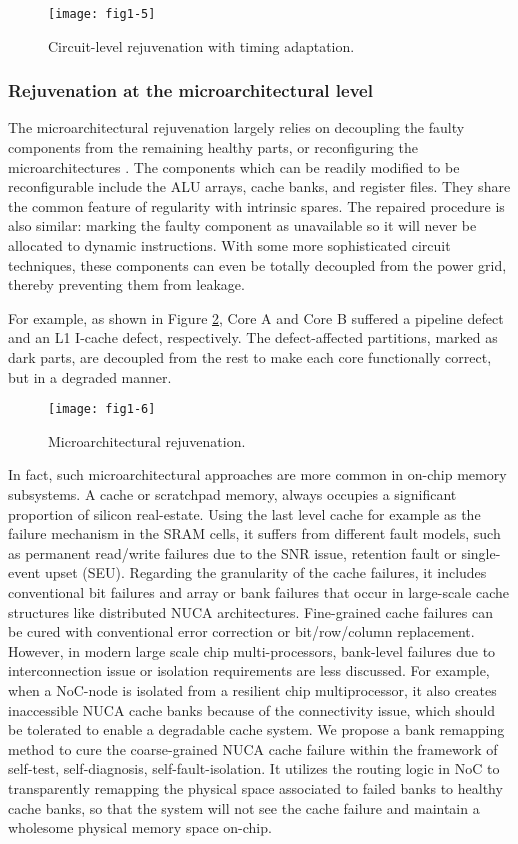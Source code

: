 \begin{figure}[t]
\centering
\texttt{[image: fig1-5]}
\caption{Circuit-level rejuvenation with timing adaptation.}
\label{fig:circuit-repair} 
\end{figure}


\subsubsection{Rejuvenation at the microarchitectural level}
The microarchitectural rejuvenation largely relies on decoupling the faulty components from the remaining healthy parts, or reconfiguring the microarchitectures \cite{salvaging}. The components which can be readily modified to be reconfigurable include the ALU arrays, cache banks, and register files. They share the common feature of regularity with intrinsic spares. The repaired procedure is also similar: marking the faulty component as unavailable so it will never be allocated to dynamic instructions. With some more sophisticated circuit techniques, these components can even be totally decoupled from the power grid, thereby preventing them from leakage.

For example, as shown in Figure \ref{fig:microarch-repair}, Core A and Core B suffered a pipeline defect and an L1 I-cache defect, respectively. The defect-affected partitions, marked as dark parts, are decoupled from the rest to make each core functionally correct, but in a degraded manner.

\begin{figure}[t]
\centering
\texttt{[image: fig1-6]}
\caption{Microarchitectural rejuvenation.}
\label{fig:microarch-repair} 
\end{figure}

In fact, such microarchitectural approaches are more common in on-chip memory subsystems. A cache or scratchpad memory, always occupies a significant proportion of silicon real-estate. Using the last level cache for example as the failure mechanism in the SRAM cells, it suffers from different fault models, such as permanent read/write failures due to the SNR issue, retention fault or single-event upset (SEU). Regarding the granularity of the cache failures, it includes conventional bit failures and array or bank failures that occur in large-scale cache structures like distributed NUCA architectures. Fine-grained cache failures can be cured with conventional error correction or bit/row/column replacement. However, in modern large scale chip multi-processors, bank-level failures due to interconnection issue or isolation requirements are less discussed. For example, when a NoC-node is isolated from a resilient chip multiprocessor, it also creates inaccessible NUCA cache banks because of the connectivity issue, which should be tolerated to enable a degradable cache system. We propose a bank remapping method to cure the coarse-grained NUCA cache failure within the framework of self-test, self-diagnosis, self-fault-isolation. It utilizes the routing logic in NoC to transparently remapping the physical space associated to failed banks to healthy cache banks, so that the system will not see the cache failure and maintain a wholesome physical memory space on-chip. 

